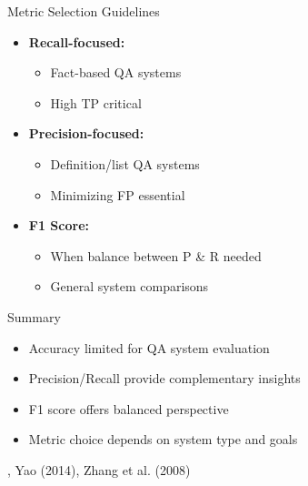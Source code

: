 \begin{frame}{Metric Selection Guidelines}
\begin{itemize}
    \item \textbf{Recall-focused:}
    \begin{itemize}
        \item Fact-based QA systems
        \item High TP critical
    \end{itemize}

    \item \textbf{Precision-focused:}
    \begin{itemize}
        \item Definition/list QA systems
        \item Minimizing FP essential
    \end{itemize}

    \item \textbf{F1 Score:}
    \begin{itemize}
        \item When balance between P \& R needed
        \item General system comparisons
    \end{itemize}
\end{itemize}
\end{frame}

\begin{frame}{Summary}
\begin{itemize}
    \item Accuracy limited for QA system evaluation
    \item Precision/Recall provide complementary insights
    \item F1 score offers balanced perspective
    \item Metric choice depends on system type and goals
\end{itemize}

\footnotesize{\cite{kumar2019}, Yao (2014), Zhang et al. (2008)}
\end{frame}


